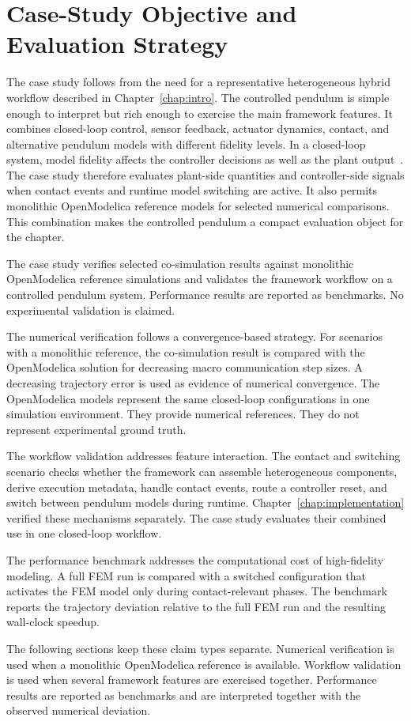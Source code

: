 \section{Case-Study Objective and Evaluation Strategy}
\label{sec:case_study_strategy}

The case study follows from the need for a representative heterogeneous hybrid workflow described in Chapter~\ref{chap:intro}.
The controlled pendulum is simple enough to interpret but rich enough to exercise the main framework features.
It combines closed-loop control, sensor feedback, actuator dynamics, contact, and alternative pendulum models with different fidelity levels.
In a closed-loop system, model fidelity affects the controller decisions as well as the plant output~\cite{williams_variable_2014}.
The case study therefore evaluates plant-side quantities and controller-side signals when contact events and runtime model switching are active.
It also permits monolithic OpenModelica reference models for selected numerical comparisons.
This combination makes the controlled pendulum a compact evaluation object for the chapter.

The case study verifies selected co-simulation results against monolithic OpenModelica reference simulations and validates the framework workflow on a controlled pendulum system.
Performance results are reported as benchmarks.
No experimental validation is claimed.

The numerical verification follows a convergence-based strategy.
For scenarios with a monolithic reference, the co-simulation result is compared with the OpenModelica solution for decreasing macro communication step sizes.
A decreasing trajectory error is used as evidence of numerical convergence.
The OpenModelica models represent the same closed-loop configurations in one simulation environment.
They provide numerical references.
They do not represent experimental ground truth.

The workflow validation addresses feature interaction.
The contact and switching scenario checks whether the framework can assemble heterogeneous components, derive execution metadata, handle contact events, route a controller reset, and switch between pendulum models during runtime.
Chapter~\ref{chap:implementation} verified these mechanisms separately.
The case study evaluates their combined use in one closed-loop workflow.

The performance benchmark addresses the computational cost of high-fidelity modeling.
A full \ac{FEM} run is compared with a switched configuration that activates the \ac{FEM} model only during contact-relevant phases.
The benchmark reports the trajectory deviation relative to the full \ac{FEM} run and the resulting wall-clock speedup.

The following sections keep these claim types separate.
Numerical verification is used when a monolithic OpenModelica reference is available.
Workflow validation is used when several framework features are exercised together.
Performance results are reported as benchmarks and are interpreted together with the observed numerical deviation.
